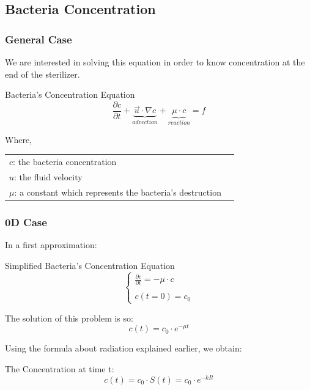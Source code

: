 \documentclass[xcolor=dvipsnames,10pt]{beamer}
\begin{document}

\subsection{Bacteria Concentration}

\begin{frame}
	\frametitle{General Case}
	We are interested in solving this equation in order to know concentration at the end of the sterilizer. \\
	\begin{block}{Bacteria's Concentration Equation}
		\begin{equation}
			\frac{\partial{c}}{\partial{t}} + \underbrace{\vec{u}\cdot \nabla c}_{advection} + \underbrace{\mu\cdot c}_{reaction} = f
		\end{equation}
	\end{block}
Where,
	{\footnotesize
	\begin{tabular}{ll}
		$c$: the bacteria concentration\\
		$u$: the fluid velocity\\
		$\mu$: a constant which represents the bacteria's destruction
	\end{tabular}
	}
\end{frame}


\begin{frame}
	\frametitle{0D Case}
	In a first approximation:
 	\begin{block}{Simplified Bacteria's Concentration Equation}
		\begin{equation}
			\left\{ \begin{array}{cl}
			\frac{\partial{c}}{\partial{t}}= -\mu\cdot c\\
			\\
			c(t=0)=c_0
			\end{array}
			\right.
		\end{equation}

	 The solution of this problem is so: 
	\begin{equation}
		c(t) = c_0\cdot e^{-\mu t}
	\end{equation}
	\end{block}

	Using the formula about radiation explained earlier, we obtain: 
	\begin{block}{The Concentration at time t:}
		\begin{equation}
			c(t) = c_0\cdot S(t) = c_0\cdot e^{-kIt}
		\end{equation}
	\end{block}
\end{frame}
\end{document}
